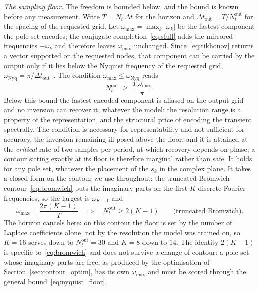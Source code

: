 ﻿\documentclass[a4paper,12pt]{article}
\theoremstyle{definition}
\theoremstyle{remark}
\begin{document}
\emph{The sampling floor.}
The freedom is bounded below, and the bound is known before any measurement. Write $T = N_t\,\Delta t$ for the horizon and $\Delta t_{\mathrm{out}} = T/N_t^{\mathrm{out}}$ for the spacing of the requested grid. Let $\omega_{\max} = \max_k |\omega_k|$ be the fastest component the pole set encodes; the conjugate completion~\eqref{eq:sfull} adds the mirrored frequencies $-\omega_k$ and therefore leaves $\omega_{\max}$ unchanged. Since~\eqref{eq:tikhonov} returns a vector supported on the requested nodes, that component can be carried by the output only if it lies below the Nyquist frequency of the requested grid, $\omega_{\mathrm{Nyq}} = \pi/\Delta t_{\mathrm{out}}$~\cite{shannon1949}. The condition $\omega_{\max} \leq \omega_{\mathrm{Nyq}}$ reads
\begin{equation}
\label{eq:nyquist_floor}
    N_t^{\mathrm{out}} \;\geq\; \frac{T\,\omega_{\max}}{\pi}.
\end{equation}
Below this bound the fastest encoded component is aliased on the output grid and no inversion can recover it, whatever the model: the resolution range is a property of the representation, and the structural price of encoding the transient spectrally. The condition is necessary for representability and not sufficient for accuracy, the inversion remaining ill-posed above the floor, and it is attained at the \emph{critical} rate of two samples per period, at which recovery depends on phase; a contour sitting exactly at its floor is therefore marginal rather than safe. It holds for any pole set, whatever the placement of the $s_k$ in the complex plane. It takes a closed form on the contour we use throughout: the truncated Bromwich contour~\eqref{eq:bromwich} puts the imaginary parts on the first $K$ discrete Fourier frequencies, so the largest is $\omega_{K-1}$ and
\begin{equation}
\label{eq:floor_bromwich}
    \omega_{\max} = \frac{2\pi (K-1)}{T}
    \quad\Longrightarrow\quad
    N_t^{\mathrm{out}} \geq 2(K-1)
    \qquad \text{(truncated Bromwich).}
\end{equation}
The horizon cancels here: on this contour the floor is set by the number of Laplace coefficients alone, not by the resolution the model was trained on, so $K = 16$ serves down to $N_t^{\mathrm{out}} = 30$ and $K = 8$ down to $14$. The identity $2(K-1)$ is specific to~\eqref{eq:bromwich} and does not survive a change of contour: a pole set whose imaginary parts are free, as produced by the optimisation of Section~\ref{sec:contour_optim}, has its own $\omega_{\max}$ and must be scored through the general bound~\eqref{eq:nyquist_floor}.
\end{document}
